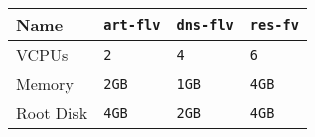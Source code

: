 \begin{table}[ht]
\centering
\begin{tabular}{|l|l|l|l|}
\hline
Name      & \verb=art-flv= & \verb=dns-flv= & \verb=res-fv= \\
\hline
VCPUs     & \verb=2=       & \verb=4=       & \verb=6=      \\
Memory    & \verb=2GB=     & \verb=1GB=     & \verb=4GB=    \\
Root Disk & \verb=4GB=     & \verb=2GB=     & \verb=4GB=    \\
\hline
\end{tabular}
\end{table}